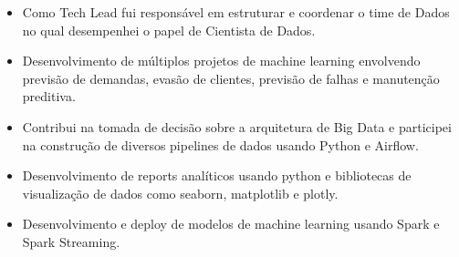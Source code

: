 \documentclass[10pt,a4paper,ragged2e]{altacv}
\begin{document}
\divider

\begin{itemize}

\item Como Tech Lead fui responsável em estruturar e coordenar o time de Dados
      no qual desempenhei o papel de Cientista de Dados.

\item Desenvolvimento de múltiplos projetos de machine learning envolvendo previsão
      de demandas, evasão de clientes, previsão de falhas e manutenção preditiva.
      
\item Contribui na tomada de decisão sobre a arquitetura de Big Data e participei
      na construção de diversos pipelines de dados usando Python e Airflow.

\item Desenvolvimento de reports analíticos usando python e bibliotecas de visualização
      de dados como seaborn, matplotlib e plotly.

\item Desenvolvimento e deploy de modelos de machine learning usando Spark 
      e Spark Streaming.


\end{itemize}



\divider






\clearpage
\end{document}
